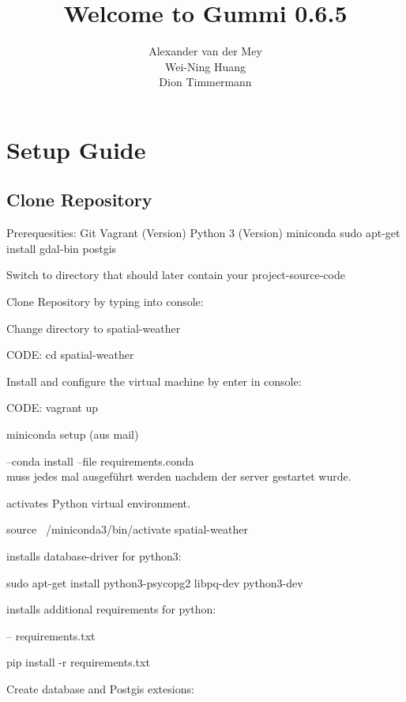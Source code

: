 \documentclass[11pt]{article}
\title{\textbf{Welcome to Gummi 0.6.5}}
\author{Alexander van der Mey\\
		Wei-Ning Huang\\
		Dion Timmermann}
\date{}
\begin{document}
\maketitle

\section{Setup Guide}
\subsection{Clone Repository}

Prerequesities:
Git
Vagrant (Version)
Python 3 (Version)
miniconda
sudo apt-get install gdal-bin postgis

Switch to directory that should later contain your project-source-code

Clone Repository by typing into console:

Change directory to spatial-weather

CODE: cd spatial-weather

Install and configure the virtual machine by enter in console:

CODE: vagrant up

miniconda setup (aus mail)

--conda install --file requirements.conda
\\

muss jedes mal ausgeführt werden nachdem der server gestartet wurde.

activates Python virtual environment.

source ~/miniconda3/bin/activate spatial-weather

installs database-driver for python3:

sudo apt-get install python3-psycopg2 libpq-dev python3-dev

installs additional requirements for python:

-- requirements.txt

pip install -r requirements.txt


Create database and Postgis extesions:

\end{document}
